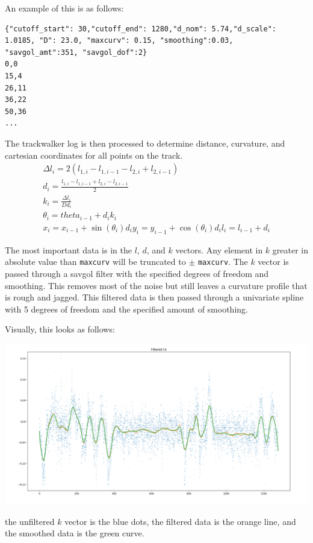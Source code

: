 \documentclass{article}
\begin{document}
An example of this is as follows:

\begin{lstlisting}
{"cutoff_start": 30,"cutoff_end": 1280,"d_nom": 5.74,"d_scale": 1.0185, "D": 23.0, "maxcurv": 0.15, "smoothing":0.03, "savgol_amt":351, "savgol_dof":2}
0,0
15,4
26,11
36,22
50,36
...
\end{lstlisting}

The trackwalker log is then processed to determine distance, curvature, and cartesian coordinates for all points on the track.
\begin{align}
	\Delta l_{i} = 2 (l_{1,i}-l_{1,i-1}-l_{2,i}+l_{2,i-1})\\
	d_i = \frac{l_{1,i}-l_{1,i-1} + l_{2,i} - l_{2,i-1}}{2}\\
	k_i = \frac{\Delta l_i}{D d_i}\\
	\theta_i = theta_{i-1} + d_i k_i\\
	x_i = x_{i-1} + \sin(\theta_i) d_i
	y_i = y_{i-1} + \cos(\theta_i) d_i
	l_i = l_{i-1} + d_i
\end{align}

The most important data is in the $l$, $d$, and $k$ vectors. Any element in $k$ greater in absolute value than \texttt{maxcurv} will be truncated to $\pm$ \texttt{maxcurv}. The $k$ vector is passed through a savgol filter with the specified degrees of freedom and smoothing. This removes most of the noise but still leaves a curvature profile that is rough and jagged. This filtered data is then passed through a univariate spline with 5 degrees of freedom and the specified amount of smoothing.

Visually, this looks as follows:

\includegraphics[width=\textwidth]{tw_filtering.png}

the unfiltered $k$ vector is the blue dots, the filtered data is the orange line, and the smoothed data is the green curve.
\end{document}
